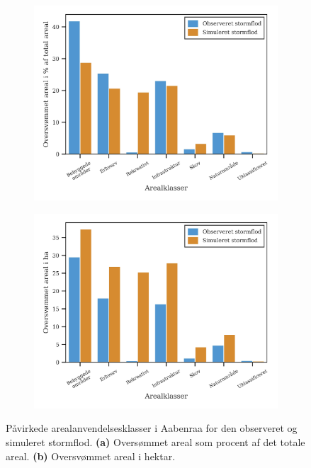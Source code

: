 \begin{figure}[H]
    \begin{subfigure}[t]{0.5\textwidth}
        \centering
        \includegraphics[width=1\linewidth]{images/Resultater/areal_anvendelses_grafer/aabenraa_arealanvendelse.jpg}
        \caption{}
        \label{Subfig: Arealklasser i procent Aabenraa}
    \end{subfigure}
    \begin{subfigure}[t]{0.5\textwidth}
        \centering
        \includegraphics[width=1\linewidth]{images/Resultater/areal_anvendelses_grafer/aabenraa_oversvommet_Hektar.jpg}
        \caption{}
        \label{Subfig: Hektar arealklasser Aabenraa}
    \end{subfigure}
    \caption{Påvirkede arealanvendelsesklasser i Aabenraa for den observeret og simuleret stormflod. \textbf{(a)} Oversømmet areal som procent af det totale areal. \textbf{(b)} Oversvømmet areal i hektar.}
    \label{Figur: Påvirket arealanvendelse Aabenraa}
\end{figure}

